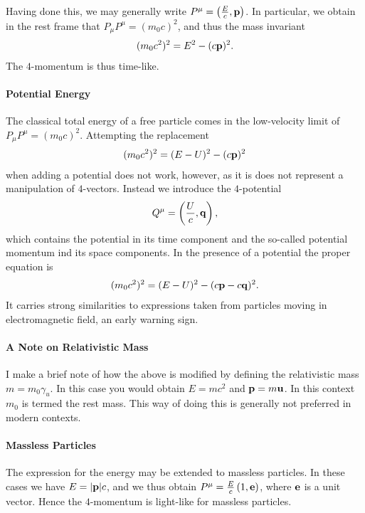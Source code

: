 Having done this, we may generally write $P^{\mu} = \left(\frac{E}{c}, \vb{p}\right)$. In particular, we obtain in the rest frame that $P_{\mu}P^{\mu} = (m_{0}c)^{2}$, and thus the mass invariant
\begin{align*}
	(m_{0}c^{2})^{2} = E^{2} - (c\vb{p})^{2}.
\end{align*}
The $4$-momentum is thus time-like.

\paragraph{Potential Energy}
The classical total energy of a free particle comes in the low-velocity limit of $P_{\mu}P^{\mu} = (m_{0}c)^{2}$. Attempting the replacement
\begin{align*}
	(m_{0}c^{2})^{2} = (E - U)^{2} - (c\vb{p})^{2}
\end{align*}
when adding a potential does not work, however, as it is does not represent a manipulation of $4$-vectors. Instead we introduce the $4$-potential
\begin{align*}
	Q^{\mu} = \left(\frac{U}{c}, \vb{q}\right),
\end{align*}
which contains the potential in its time component and the so-called potential momentum ind its space components. In the presence of a potential the proper equation is
\begin{align*}
	(m_{0}c^{2})^{2} = (E - U)^{2} - (c\vb{p} - c\vb{q})^{2}.
\end{align*}
It carries strong similarities to expressions taken from particles moving in electromagnetic field, an early warning sign.

\paragraph{A Note on Relativistic Mass}
I make a brief note of how the above is modified by defining the relativistic mass $m = m_{0}\gamma_{u}$. In this case you would obtain $E = mc^{2}$ and $\vb{p} = m\vb{u}$. In this context $m_{0}$ is termed the rest mass. This way of doing this is generally not preferred in modern contexts.

\paragraph{Massless Particles}
The expression for the energy may be extended to massless particles. In these cases we have $E = \abs{\vb{p}}c$, and we thus obtain $P^{\mu} = \frac{E}{c}\left(1, \vb{e}\right)$, where $\vb{e}$ is a unit vector. Hence the $4$-momentum is light-like for massless particles.

